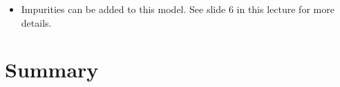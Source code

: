 \documentclass[11pt, oneside]{article}
\begin{document}
\begin{itemize}
\begin{equation}
	\end{equation}
	where the variables follow the same basic definitions as for pure water.
	The approximation for $\varepsilon''$ holds because $\omega\tau_i \gg 1$ at microwave frequencies; the slow rotation of H$_2$O molecules in ice puts its relaxation frequency in the kilohertz range, so microwave RS sees only the high-frequency tail of this mechanism. This Debye tail dominates $\varepsilon''$ only below about 1--3 GHz. At higher frequencies, an infrared absorption term that increases in proportion to frequency takes over, so that $\varepsilon''$ of ice has a minimum near 1 GHz and rises with frequency above it (Ulaby and Long, 2014, Eq.~4.24 and Fig.~4-3).
	\item Impurities can be added to this model. See slide 6 in this lecture for more details.
\end{itemize}

\section{Summary}
\end{document}
